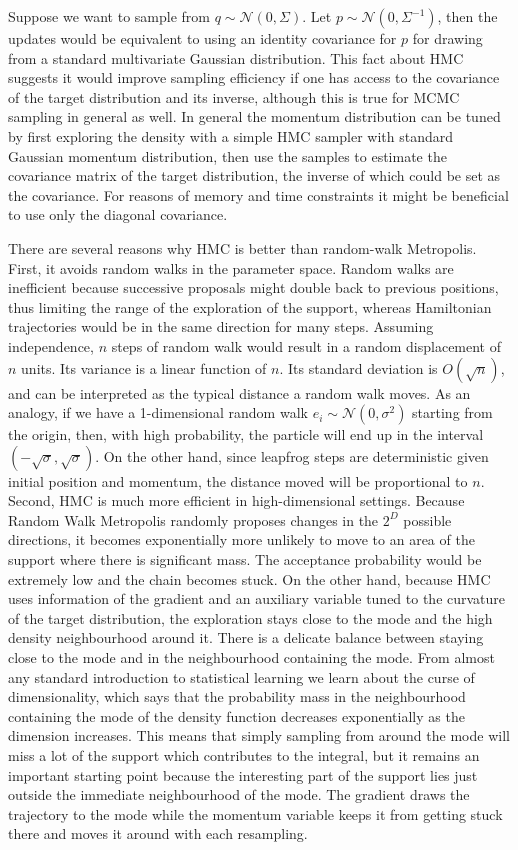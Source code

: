 \documentclass[12pt]{report}
\begin{document}
Suppose we want to sample from $q \sim \mathcal{N}(0,\Sigma)$. Let $p \sim
\mathcal{N}(0,\Sigma^{-1})$, then the updates would be equivalent to using an
identity covariance for $p$ for drawing from a standard multivariate Gaussian
distribution. This
fact about HMC suggests it would improve sampling efficiency if one has
access to the covariance of the target distribution and its inverse, although this is true for
MCMC sampling in general as well. 
In general the momentum distribution can be tuned by first exploring the density
with a simple HMC sampler with standard Gaussian momentum distribution, then use
the samples to estimate the covariance matrix of the target distribution, the
inverse of which could be set as the covariance.  For reasons of memory and time constraints it might be beneficial to use only the diagonal covariance. 

There are several reasons why HMC is better than random-walk Metropolis. First,
it avoids random walks in the parameter space. Random walks are inefficient because successive
proposals might double back to previous positions, thus limiting the range of
the exploration of the support, whereas Hamiltonian trajectories would be in the
same direction for many steps. Assuming independence, $n$ steps of random walk
would result in a random displacement of $n$ units. Its variance  
is a linear function of $n$. Its standard deviation is $O(\sqrt{n})$, and can be
interpreted as the typical distance a random walk moves. As an analogy, if we
have a 1-dimensional random walk $e_i \sim \mathcal{N}(0,\sigma^2)$ starting from
the origin, then,  with high probability, the particle will end up in the
interval $(-\sqrt{\sigma},\sqrt{\sigma})$. 
On the other hand, since leapfrog steps are deterministic given initial position
and momentum, the distance moved will be proportional to $n$. 
Second, HMC is much more efficient in
high-dimensional settings. Because Random Walk Metropolis randomly proposes changes in
the $2^D$ possible directions, it becomes exponentially more unlikely to move
to an area of the support where there is significant mass. The acceptance
probability would be extremely low and the chain becomes stuck. On the other
hand, because HMC uses information of the gradient and an auxiliary variable
tuned to the curvature of the target distribution, the exploration stays close
to the mode and the high density neighbourhood around it. There is a delicate
balance between staying close to the mode and in the neighbourhood containing
the mode. From almost any standard introduction to statistical learning \cite{friedman2001elements} we learn about the curse of dimensionality, which says that the probability mass in the neighbourhood containing the mode of the density function decreases exponentially as the dimension increases. This means that simply sampling from around the mode will miss a lot of the support which contributes to the integral, but it remains an important starting point because the interesting part of the support lies just outside the immediate neighbourhood of the mode. The gradient draws the
trajectory to
the mode while the momentum variable keeps it from getting stuck there and moves it around with each resampling.
\end{document}
